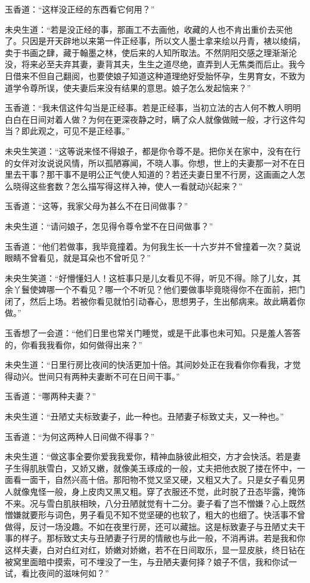 \documentclass[a4paper,12pt,UTF8,twoside]{ctexbook}
\begin{document}
玉香道：“这样没正经的东西看它何用？”

未央生道：“若是没正经的事，那画工不去画他，收藏的人也不肯出重价去买他了。只因是开天辟地以来第一件正经事，所以文人墨士拿来绘以丹青，裱以绫绢，卖于书画之肆，藏于翰墨之林，使后来的人知所取法。不然阴阳交感之理渐渐沦没，将来必至夫弃其妻，妻背其夫，生生之道尽绝，直弄到人无焦类而后止。我今日借来不但自己翻阅，也要使娘子知道这种道理绝好受胎怀孕，生男育女，不致为道学令尊所误，使夫妻后来没有结果的意思。娘子怎么发起恼来？”

玉香道：“我未信这件勾当是正经事。若是正经事，当初立法的古人何不教人明明白白在日间对着人做？为何在更深夜静之时，瞒了众人就像做贼一般，才行这件勾当？即此观之，可见不是正经事。”

未央生笑道：“这等说来怪不得娘子，都是你令尊不是。把你关在家中，没有在行的女伴对汝说说风情，所以孤陋寡闻，不晓人事。你想，世上的夫妻那一对不在日里去干事？那干事不是明公正气使人知道的？若还夫妻日里不行房，这画画之人怎么晓得这些套数？怎么描写得这样入神，使人一看就动兴起来？”

玉香道：“这等，我家父母为甚么不在日间做事？”

未央生道：“请问娘子，怎见得令尊令堂不在日间做事？”

玉香道：“他们若做事，我毕竟撞着。为何我生长一十六岁并不曾撞着一次？莫说眼睛不曾看见，就是耳朵也不曾听见？”

未央生笑道：“好懵懂妇人！这桩事只是儿女看见不得，听见不得。除了儿女，其余丫鬟使婢哪一个不看见？哪一个不听见？他们要做事毕竟晓得你不在面前，把门闭了，然后上场。若被你看见就怕引动春心，思想男子，生出郁病来。故此瞒着你做。”

玉香想了一会道：“他们日里也常关门睡觉，或是干此事也未可知。只是羞人答答的，你看我我看你，如何做得出来？”

未央生道：“日里行房比夜间的快活更加十倍。其间妙处正在我看你你看我，才觉得动兴。世间只有两种夫妻断不可在日间干事。”

玉香道：“哪两种夫妻？”

未央生道：“丑陋丈夫标致妻子，此一种也。丑陋妻子标致丈夫，又一种也。”

玉香道：“为何这两种人日间做不得事？”

未央生道：“做这事全要你爱我我爱你，精神血脉彼此相交，方才会快活。若是妻子生得肌肤雪白，又娇又嫩，就像美玉琢成的一般，丈夫把他衣脱了搂在怀中，一面看一面干，自然兴高十倍。那阳物不觉又坚又硬，又粗又大了。只是女子看见男人就像鬼怪一般，身上皮肉又黑又粗。穿了衣服还不觉，此时脱了丑态毕露，掩饰不来。况与雪白肌肤相映，八分丑陋就觉有十二分。妻子看了岂不憎嫌？心上既然憎嫌就要形与词色，男子看见不知不觉坚硬的也软了，粗大的也细了。快活事不曾做得，反讨一场没趣。不如在夜里行房，还可以藏拙。这是标致妻子与丑陋丈夫干事的样子。那标致丈夫与丑陋妻子行房的情敝也与此一般，不消再讲。若是我和你这样夫妻，白对白红对红，娇嫩对娇嫩，若不在日间取乐，显一显皮肤，终日钻在被窝里面暗中摸索，可不埋没了一生，与丑陋夫妻何择？娘子不信，我和你试一试，看比夜间的滋味何如？”
\end{document}
